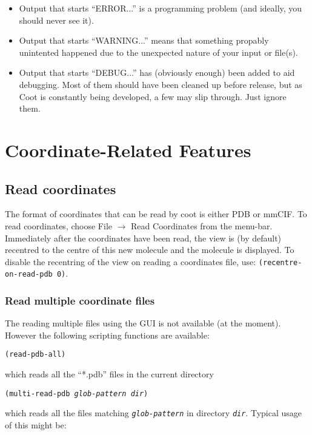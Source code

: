 \documentclass{book}
\begin{document}
\begin{itemize}
\item Output that starts ``ERROR...'' is a programming problem (and
  ideally, you should never see it).
\item Output that starts ``WARNING...'' means that something propably
unintented happened due to the unexpected nature of your input or
file(s).
\item Output that starts ``DEBUG...'' has (obviously enough) been
  added to aid debugging.  Most of them should have been cleaned up
  before release, but as Coot is constantly being developed, a few may
  slip through.  Just ignore them.
\end{itemize}


\chapter{Coordinate-Related Features}


\section{Read coordinates}
The format of coordinates that can be read
by coot is either PDB or mmCIF.  To read coordinates, choose
\textsf{File $\rightarrow$ Read Coordinates} from the menu-bar.
Immediately after the coordinates have been read, the view is (by
default) recentred to the centre of this new molecule and the molecule
is displayed.  To disable the recentring of the view on reading a
coordinates file, use: \texttt{(recentre-on-read-pdb 0)}.

\subsection{Read multiple coordinate files}
The reading multiple files using the GUI is not available (at the
moment).  However the following scripting functions are available:

\texttt{(read-pdb-all)}

which reads all the ``*.pdb'' files in the current directory

\texttt{(multi-read-pdb \emph{glob-pattern} \emph{dir})}

which reads all the files matching \texttt{\emph{glob-pattern}} in
directory \texttt{\emph{dir}}.  Typical usage of this might be:
\end{document}
